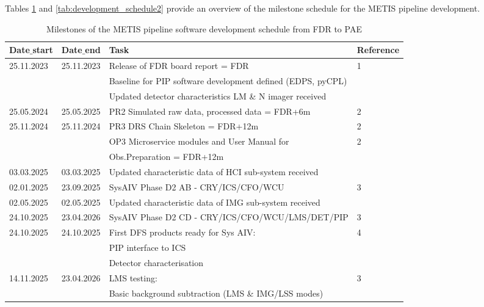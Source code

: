 Tables \ref{tab:development_schedule1} and \ref{tab:development_schedule2} provide an overview of the milestone schedule for the METIS pipeline development.

\begin{table}[h!]
    \caption[Development schedule]{Milestones of the METIS pipeline software development schedule from FDR to PAE}
  \label{tab:development_schedule1}

\centering
\scriptsize
\begin{tabularx}{\textwidth}{llll}

\hline
Date$\_$start &	Date$\_$end   &	Task                            &		Reference \\
\hline\hline
25.11.2023 & 25.11.2023 & Release of FDR board report = FDR        &	1 \\
	  &		   & Baseline for PIP software development defined (EDPS, pyCPL) &	\\
    &    	 & Updated detector characteristics LM \& N imager received    &	\\
\hline
25.05.2024 & 25.05.2025 & PR2 Simulated raw data, processed data = FDR+6m &	2 \\
\hline
25.11.2024 & 25.11.2024 & PR3 DRS Chain Skeleton = FDR+12m     &	2 \\
	&		 &	OP3 Microservice modules and User Manual for                &	2 \\
    &        &  Obs.Preparation = FDR+12m                                 &	\\
\hline
03.03.2025 & 03.03.2025 & Updated characteristic data of HCI sub-system received & \\
\hline
02.01.2025 & 23.09.2025 & SysAIV Phase D2 AB - CRY/ICS/CFO/WCU          &	3 \\
\hline
02.05.2025 & 02.05.2025 & Updated characteristic data of IMG sub-system received & \\
\hline
24.10.2025 & 23.04.2026 & SysAIV Phase D2 CD - CRY/ICS/CFO/WCU/LMS/DET/PIP            &	3 \\
\hline
24.10.2025 & 24.10.2025 & First DFS products ready for Sys AIV:            &	4 \\
    &          &  PIP interface to ICS                                        &	\\
    &          &  Detector characterisation                                   &	\\
\hline
14.11.2025 & 23.04.2026 & LMS testing:                                      &	3 \\ 
    &          & Basic background subtraction (LMS \& IMG/LSS modes)          &	\\

\end{tabularx}
\end{table}
